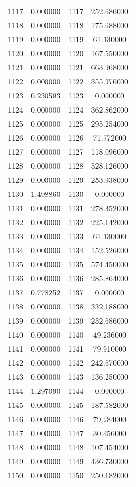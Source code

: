 \documentclass[12pt]{article}
\begin{document}
\begin{longtable}{@{}cccc@{}}
1117 & 0.000000 & 1117 & 252.686000 \\
1118 & 0.000000 & 1118 & 175.688000 \\
1119 & 0.000000 & 1119 & 61.130000 \\
1120 & 0.000000 & 1120 & 167.550000 \\
1121 & 0.000000 & 1121 & 663.968000 \\
1122 & 0.000000 & 1122 & 355.976000 \\
1123 & 0.230593 & 1123 & 0.000000 \\
1124 & 0.000000 & 1124 & 362.862000 \\
1125 & 0.000000 & 1125 & 295.254000 \\
1126 & 0.000000 & 1126 & 71.772000 \\
1127 & 0.000000 & 1127 & 118.096000 \\
1128 & 0.000000 & 1128 & 528.126000 \\
1129 & 0.000000 & 1129 & 253.938000 \\
1130 & 1.498860 & 1130 & 0.000000 \\
1131 & 0.000000 & 1131 & 278.352000 \\
1132 & 0.000000 & 1132 & 225.142000 \\
1133 & 0.000000 & 1133 & 61.130000 \\
1134 & 0.000000 & 1134 & 152.526000 \\
1135 & 0.000000 & 1135 & 574.450000 \\
1136 & 0.000000 & 1136 & 285.864000 \\
1137 & 0.778252 & 1137 & 0.000000 \\
1138 & 0.000000 & 1138 & 332.188000 \\
1139 & 0.000000 & 1139 & 252.686000 \\
1140 & 0.000000 & 1140 & 49.236000 \\
1141 & 0.000000 & 1141 & 79.910000 \\
1142 & 0.000000 & 1142 & 242.670000 \\
1143 & 0.000000 & 1143 & 136.250000 \\
1144 & 1.297090 & 1144 & 0.000000 \\
1145 & 0.000000 & 1145 & 187.582000 \\
1146 & 0.000000 & 1146 & 79.284000 \\
1147 & 0.000000 & 1147 & 30.456000 \\
1148 & 0.000000 & 1148 & 107.454000 \\
1149 & 0.000000 & 1149 & 436.730000 \\
1150 & 0.000000 & 1150 & 250.182000 \\

\end{longtable}
\end{document}
